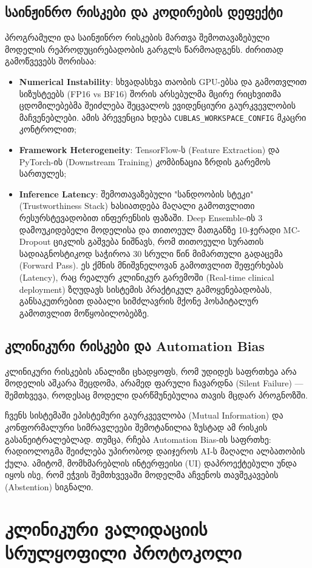 \documentclass[12pt,a4paper,oneside]{report}
\begin{document}
\section{საინჟინრო რისკები და კოდირების დეფექტი}
პროგრამული და საინჟინრო რისკების მართვა შემოთავაზებული მოდელის რეპროდუცირებადობის გარგლს წარმოადგენს. ძირითად გამოწვევებს შორისაა:
\begin{itemize}
    \item \textbf{Numerical Instability}: სხვადასხვა თაობის GPU-ებსა და გამოთვლით სიზუსტეებს (FP16 vs BF16) შორის არსებულმა მცირე რიცხვითმა ცდომილებებმა შეიძლება შეცვალოს ევიდენციური გაურკვევლობის მაჩვენებლები. ამის პრევენცია ხდება \texttt{CUBLAS\_WORKSPACE\_CONFIG} მკაცრი კონტროლით;
    \item \textbf{Framework Heterogeneity}: TensorFlow-ს (Feature Extraction) და PyTorch-ის (Downstream Training) კომბინაცია ზრდის გარემოს სართულეს;
    \item \textbf{Inference Latency}: შემოთავაზებული "სანდოობის სტეკი" (Trustworthiness Stack) ხასიათდება მაღალი გამოთვლითი რესურსტევადობით ინფერენსის ფაზაში. Deep Ensemble-ის 3 დამოუკიდებელი მოდელისა და თითოეულ მათგანზე 10-ჯერადი MC-Dropout ციკლის გაშვება ნიშნავს, რომ თითოეული სურათის სადიაგნოსტიკოდ საჭიროა 30 სრული წინ მიმართული გადაცემა (Forward Pass). ეს ქმნის მნიშვნელოვან გამოთვლით შეფერხებას (Latency), რაც რეალურ კლინიკურ გარემოში (Real-time clinical deployment) ზღუდავს სისტემის პრაქტიკულ გამოყენებადობას, განსაკუთრებით დაბალი სიმძლავრის მქონე ჰოსპიტალურ გამოთვლით მოწყობილობებზე.
\end{itemize}

\section{კლინიკური რისკები და Automation Bias}
კლინიკური რისკების ანალიზი ცხადყოფს, რომ უდიდეს საფრთხეა არა მოდელის აშკარა შეცდომა, არამედ ფარული ჩავარდნა (Silent Failure) — შემთხვევა, როდესაც მოდელი დარწმუნებულია თავის მცდარ პროგნოზში. 

ჩვენს სისტემაში ეპისტემური გაურკვევლობა (Mutual Information) და კონფორმალური სიმრავლეები შემოტანილია ზუსტად ამ რისკის გასანეიტრალებლად. თუმცა, რჩება Automation Bias-ის საფრთხე: რადიოლოგმა შეიძლება უპირობოდ დაიჯეროს AI-ს მაღალი ალბათობის ქულა. ამიტომ, მომხმარებლის ინტერფეისი (UI) დაპროექტებული უნდა იყოს ისე, რომ ეჭვის შემთხვევაში მოდელმა აჩვენოს თავშეკავების (Abstention) სიგნალი.

\chapter{კლინიკური ვალიდაციის სრულყოფილი პროტოკოლი}
\end{document}
